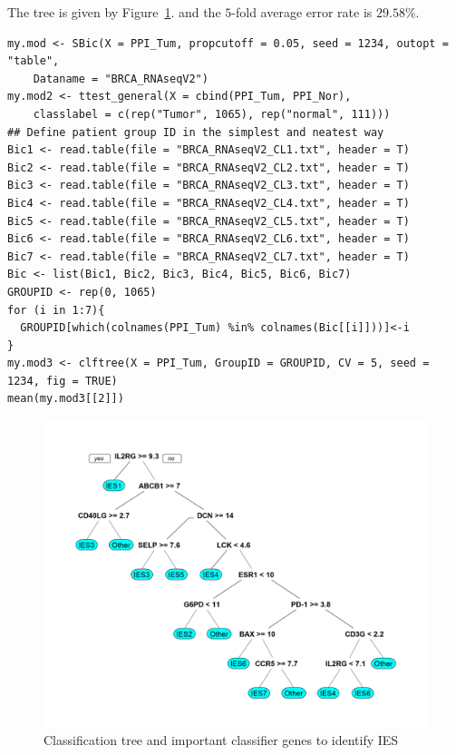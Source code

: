 \documentclass[a4paper, 11pt]{article}
\begin{document}
The tree is given by Figure~\ref{fig:clftree}. and the $5$-fold average error rate is $29.58\%$.
\begin{lstlisting}
my.mod <- SBic(X = PPI_Tum, propcutoff = 0.05, seed = 1234, outopt = "table", 
	Dataname = "BRCA_RNAseqV2")
my.mod2 <- ttest_general(X = cbind(PPI_Tum, PPI_Nor), 
	classlabel = c(rep("Tumor", 1065), rep("normal", 111)))
## Define patient group ID in the simplest and neatest way
Bic1 <- read.table(file = "BRCA_RNAseqV2_CL1.txt", header = T)
Bic2 <- read.table(file = "BRCA_RNAseqV2_CL2.txt", header = T)
Bic3 <- read.table(file = "BRCA_RNAseqV2_CL3.txt", header = T)
Bic4 <- read.table(file = "BRCA_RNAseqV2_CL4.txt", header = T)
Bic5 <- read.table(file = "BRCA_RNAseqV2_CL5.txt", header = T)
Bic6 <- read.table(file = "BRCA_RNAseqV2_CL6.txt", header = T)
Bic7 <- read.table(file = "BRCA_RNAseqV2_CL7.txt", header = T)
Bic <- list(Bic1, Bic2, Bic3, Bic4, Bic5, Bic6, Bic7)
GROUPID <- rep(0, 1065)
for (i in 1:7){
  GROUPID[which(colnames(PPI_Tum) %in% colnames(Bic[[i]]))]<-i
}
my.mod3 <- clftree(X = PPI_Tum, GroupID = GROUPID, CV = 5, seed = 1234, fig = TRUE)
mean(my.mod3[[2]])
\end{lstlisting}

\begin{figure}[!tpb]
  \begin{center}
    \includegraphics[width=11.5 cm]{figure3.png}
    \caption{Classification tree and important classifier genes to identify IES}
    \label{fig:clftree}
  \end{center}
\end{figure}
\end{document}
